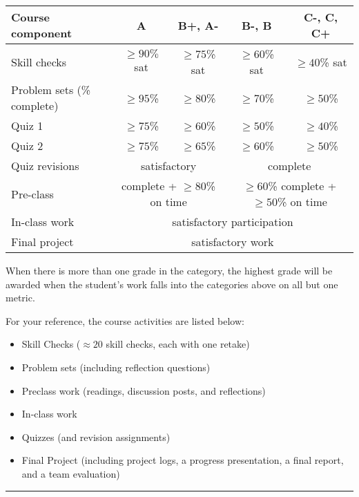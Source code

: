 \documentclass[12pt,letterpaper]{exam}
\begin{document}
\begin{tabular}{p{5cm}|c| c|c|c}
  Course component & A  & B+, A- & B-, B & C-, C, C+ \\
  \hline\hline
   Skill checks & $\geq90\%$ sat & $\geq75$\% sat & $\geq60$\% sat & $\geq40$\% sat \\
   Problem sets (\% complete) & $\geq 95$\% & $\geq 80$\%  & $\geq 70$\%  & $\geq 50$\%  \\
   Quiz 1 & $\geq 75$\% & $\geq 60$\% & $\geq 50$\% & $\geq 40$\% \\
   Quiz 2 & $\geq 75$\% & $\geq 65$\% & $\geq 60$\% & $\geq 50$\% \\
   Quiz revisions & \multicolumn{2}{c|}{satisfactory} & \multicolumn{2}{c}{complete} \\
   Pre-class & \multicolumn{2}{c|}{complete + $\geq 80$\% on time} & \multicolumn{2}{c}{$\geq60$\% complete + $\geq 50$\% on time} \\ 
   In-class work & \multicolumn{4}{c}{satisfactory participation} \\
   Final project & \multicolumn{4}{c}{satisfactory work} \\
   
\end{tabular}
\vspace{0.2cm}

\noindent When there is more than one grade in the category, the highest grade will be awarded when the student's work falls into the categories above on all but one metric.
\vspace{0.2cm}

\noindent For your reference, the course activities are listed below:

\begin{itemize}
\itemsep0pt
\item Skill Checks ($\approx 20$ skill checks, each with one retake)
\item Problem sets (including reflection questions)
\item Preclass work (readings, discussion posts, and reflections)
\item In-class work 
\item Quizzes (and revision assignments)	
\item Final Project	(including project logs, a progress presentation, a final report, and a team evaluation)
\end{itemize}
\vspace{0.5cm}
\hrule
\vspace{0.5cm}
\end{document}
